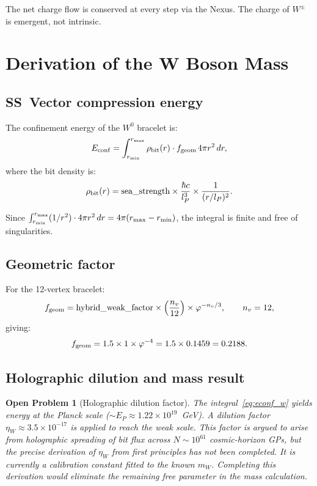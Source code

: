 \documentclass[11pt,letterpaper]{article}
\newtheorem{openprob}[theorem]{Open Problem}
\newcommand{\lP}{l_P}
\newcommand{\EP}{E_P}
\newcommand{\phig}{\varphi}
\begin{document}
The net charge flow is conserved at every step via the Nexus.  The
charge of $W^\pm$ is emergent, not intrinsic.

\section{Derivation of the W Boson Mass}

\subsection{SS~Vector compression energy}

The confinement energy of the $W^0$ bracelet is:
\begin{equation}
E_{\rm conf}
= \int_{r_{\rm min}}^{r_{\rm max}} \rho_{\rm bit}(r)\cdot f_{\rm geom}\,4\pi r^2\,dr,
\label{eq:econf_w}
\end{equation}
where the bit density is:
\begin{equation}
\rho_{\rm bit}(r)
= \text{sea\_strength}\times\frac{\hbar c}{\lP^3}
  \times\frac{1}{(r/\lP)^2}.
\label{eq:rhobit}
\end{equation}

Since $\int_{r_{\rm min}}^{r_{\rm max}}(1/r^2)\cdot 4\pi r^2\,dr
= 4\pi(r_{\rm max} - r_{\rm min})$, the integral is finite and
free of singularities.

\subsection{Geometric factor}

For the 12-vertex bracelet:
\begin{equation}
f_{\rm geom}
= \text{hybrid\_weak\_factor}
  \times\left(\frac{n_v}{12}\right)
  \times \phig^{-n_v/3},
\qquad n_v = 12,
\label{eq:fgeom_w}
\end{equation}
giving:
\begin{equation}
f_{\rm geom}
= 1.5 \times 1 \times \phig^{-4}
= 1.5 \times 0.1459
= 0.2188.
\label{eq:fgeom_w_num}
\end{equation}

\subsection{Holographic dilution and mass result}

\begin{openprob}[Holographic dilution factor]
\label{op:dilution}
The integral~\eqref{eq:econf_w} yields energy at the Planck scale
($\sim\EP \approx 1.22\times10^{19}$~GeV).  A dilution factor
$\eta_W \approx 3.5\times10^{-17}$ is applied to reach the weak
scale.  This factor is argued to arise from holographic spreading of
bit flux across $N\sim10^{61}$ cosmic-horizon GPs, but the precise
derivation of $\eta_W$ from first principles has not been completed.
It is currently a calibration constant fitted to the known $m_W$.
Completing this derivation would eliminate the remaining free
parameter in the mass calculation.
\end{openprob}
\end{document}
